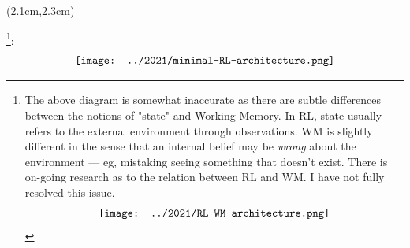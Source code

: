 \begin{preview}

\cc{
\title{\vspace{-2.2cm} \bfseries\color{blue}{\large 逻辑化 AGI 基础}}
}{
\title{\vspace{-2.2cm} \bfseries\color{blue}{\large Logical AGI basic framework}}
}

\date{\vspace{-3.2cm}} %

\maketitle

\setcounter{section}{-1}

\begin{textblock*}{5cm}(2.1cm,2.3cm) %
{}
\end{textblock*}

\begin{minipage}{\textwidth}
\setlength{\parskip}{0.4\baselineskip}

\footnote{The above diagram is somewhat inaccurate as there are subtle differences between the notions of "state" and Working Memory.  In RL, state usually refers to the external environment  through observations.  WM is slightly different in the sense that an internal belief may be \textit{wrong} about the environment --- eg, mistaking seeing something that doesn't exist.  There is on-going research as to the relation between RL and WM.  I have not fully resolved this issue.
	\begin{equation}
	\vcenter{\hbox{\texttt{[image: ../2021/RL-WM-architecture.png]}}}
	\end{equation}
	\vspace{-0.7cm}}:
\begin{equation}
\vcenter{\hbox{\texttt{[image: ../2021/minimal-RL-architecture.png]}}}
\end{equation}


\end{minipage}
\end{preview}
